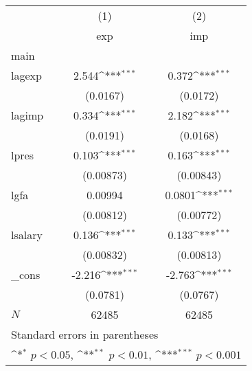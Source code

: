 {
\def\sym#1{\ifmmode^{#1}\else\(^{#1}\)\fi}
\begin{tabular}{l*{2}{c}}
\hline\hline
            &\multicolumn{1}{c}{(1)}&\multicolumn{1}{c}{(2)}\\
            &\multicolumn{1}{c}{exp}&\multicolumn{1}{c}{imp}\\
\hline
main        &                     &                     \\
lagexp      &       2.544\sym{***}&       0.372\sym{***}\\
            &    (0.0167)         &    (0.0172)         \\
[1em]
lagimp      &       0.334\sym{***}&       2.182\sym{***}\\
            &    (0.0191)         &    (0.0168)         \\
[1em]
lpres       &       0.103\sym{***}&       0.163\sym{***}\\
            &   (0.00873)         &   (0.00843)         \\
[1em]
lgfa        &     0.00994         &      0.0801\sym{***}\\
            &   (0.00812)         &   (0.00772)         \\
[1em]
lsalary     &       0.136\sym{***}&       0.133\sym{***}\\
            &   (0.00832)         &   (0.00813)         \\
[1em]
\_cons      &      -2.216\sym{***}&      -2.763\sym{***}\\
            &    (0.0781)         &    (0.0767)         \\
\hline
\(N\)       &       62485         &       62485         \\
\hline\hline
\multicolumn{3}{l}{\footnotesize Standard errors in parentheses}\\
\multicolumn{3}{l}{\footnotesize \sym{*} \(p<0.05\), \sym{**} \(p<0.01\), \sym{***} \(p<0.001\)}\\
\end{tabular}
}
